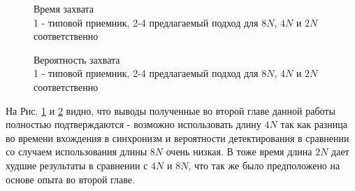 \begin{figure}[h]
\center{}
	\caption{Время захвата\\ 1 - типовой приемник, 2-4 предлагаемый подход для ${8N}$, ${4N}$ и ${2N}$ соответственно}
	\label{pic:dma5mhz_lockTime}
\end{figure}

\begin{figure}[h]
\center{}
	\caption{Вероятность захвата\\ 1 - типовой приемник, 2-4 предлагаемый подход для ${8N}$, ${4N}$ и ${2N}$ соответственно}
	\label{pic:dma5mhz_probDetection}
\end{figure}

На Рис. \ref{pic:dma5mhz_lockTime} и \ref{pic:dma5mhz_probDetection} видно, что выводы полученные во второй главе данной работы полностью подтверждаются - возможно использовать
длину ${4N}$ так как разница во времени вхождения в синхронизм и вероятности детектирования в сравнении со случаем использования длины ${8N}$ очень низкая. В тоже время
длина ${2N}$ дает худшие результаты в сравнении с ${4N}$ и ${8N}$, что так же было предположено на основе опыта во второй главе.


